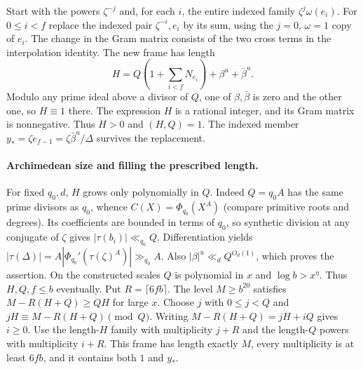 Start with the powers $\zeta^{-j}$ and, for each $i$, the entire indexed
family $\zeta^j\omega(e_i)$. For $0\le i<f$ replace the indexed
pair $\zeta^{-i}, e_i$ by its sum, using the $j=0$, $\omega=1$
copy of $e_i$. The change in the Gram matrix consists of the two
cross terms in the interpolation identity. The new frame has length
\[
 H=Q\left(1+\sum_{i<f}N_{e_i}\right)+\beta^u+\bar\beta^u .
\]
Modulo any prime ideal above a divisor of $Q$, one of
$\beta,\bar\beta$ is zero and the other one, so $H\equiv1$ there.
The expression $H$ is a rational integer, and its Gram matrix is nonnegative.
Thus $H>0$ and $(H,Q)=1$. The indexed member
$y_*=\zeta e_{f-1}=\zeta\bar\beta^u/\Delta$ survives the replacement.

\paragraph{Archimedean size and filling the prescribed length.}
For fixed $q_0,d$, $H$ grows only polynomially in $Q$.
Indeed $Q=q_0 A$ has the same prime divisors as $q_0$, whence
$C(X)=\Phi_{q_0}(X^A)$ (compare primitive roots and degrees).
Its coefficients are bounded in terms of $q_0$, so synthetic division
at any conjugate of $\zeta$ gives $|\tau(b_i)|\ll_{q_0}Q$.
Differentiation yields
$|\tau(\Delta)|=A|\Phi_{q_0}'(\tau(\zeta)^A)|\gg_{q_0}A$.
Also $|\beta|^u\ll_d Q^{O_d(1)}$, which proves the assertion.
On the constructed scales $Q$ is polynomial in $x$ and $\log b>x^\eta$.
Thus $H,Q,f\le b$ eventually. Put $R=\lceil6fb\rceil$.
The level $M\ge b^{20}$ satisfies $M-R(H+Q)\ge QH$ for large $x$.
Choose $j$ with $0\le j<Q$ and $jH\equiv M-R(H+Q)\pmod Q$.
Writing $M-R(H+Q)=jH+iQ$ gives $i\ge0$.
Use the length-$H$ family with multiplicity $j+R$ and the length-$Q$
powers with multiplicity $i+R$. This frame has length exactly $M$,
every multiplicity is at least $6fb$, and it contains both $1$ and $y_*$.

